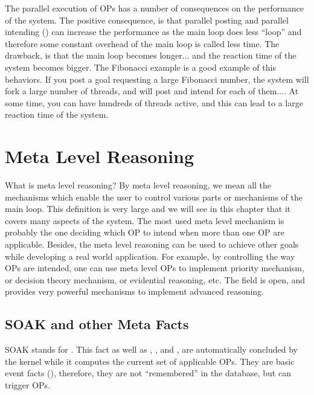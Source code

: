 The parallel execution of OPs has a number of consequences on the performance of
the system. The positive consequence, is that parallel posting and parallel
intending () can increase the performance as
the main loop does less ``loop'' and therefore some constant overhead of the
main loop is called less time. The drawback, is that the main loop becomes
longer... and the reaction time of the system becomes bigger. The Fibonacci
example is a good example of this behaviors. If you post a goal requesting
a large Fibonacci number, the system will fork a large number of threads, and
will post and intend for each of them.... At some time, you can have hundreds
of threads active, and this can lead to a large reaction time of the system.

\chapter{Meta Level Reasoning}

What is meta level reasoning? By meta level reasoning, we mean all the
mechanisms which enable the user to control various parts or mechanisms of the
\CPK{} main loop. This definition is very large and we will see in this chapter
that it covers many aspects of the \COPRS{} system. The most used meta level
mechanism is probably the one deciding which OP to intend when more than one OP
are applicable. Besides, the meta level reasoning can be used to achieve other
goals while developing a real world application. For example, by controlling
the way OPs are intended, one can use meta level OPs to implement priority
mechanism, or decision theory mechanism, or evidential reasoning, etc. The
field is open, and \COPRS{} provides very powerful mechanisms to implement
advanced reasoning.



\section{SOAK and other Meta Facts}

SOAK stands for . This fact as well as
, ,
 and , are
automatically concluded by the kernel while it computes the current set
of applicable OPs. They are basic event facts (),
therefore, they are not ``remembered'' in the database, but can trigger
OPs.

